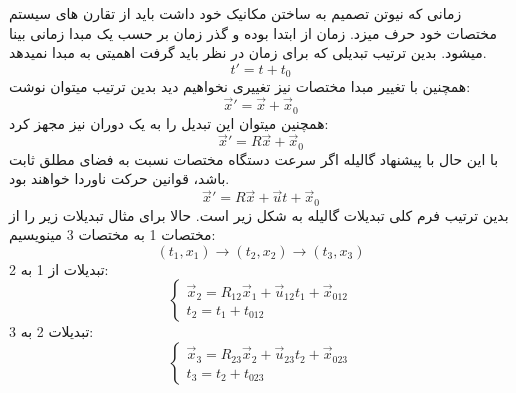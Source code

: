 \documentclass[9pt,a4paper, twocolumn]{article}
\begin{document}
            زمانی که نیوتن تصمیم به ساختن مکانیک خود داشت باید از تقارن های سیستم مختصات خود حرف میزد. زمان از ابتدا بوده و گذر زمان بر حسب یک مبدا زمانی بینا میشود. بدین ترتیب تبدیلی که برای زمان در نظر باید گرفت اهمیتی به مبدا نمیدهد.
            \begin{equation}
                t' = t+ t_0
            \end{equation}
            همچنین با تغییر مبدا مختصات نیز تغییری نخواهیم دید بدین ترتیب میتوان نوشت:
            \begin{equation}
                \vec x' = \vec x + \vec x_0
            \end{equation}
            همچنین میتوان این تبدیل را به یک دوران نیز مجهز کرد:
            \begin{equation}
                \vec x' = R \vec x + \vec x_0
            \end{equation}
            با این حال با پیشنهاد گالیله اگر سرعت دستگاه مختصات نسبت به فضای مطلق ثابت باشد، قوانین حرکت ناوردا خواهند بود.
            \begin{equation}
                \vec x' = R \vec x + \vec ut + \vec x_0
            \end{equation}
            بدین ترتیب فرم کلی تبدیلات گالیله به شکل زیر است. حالا برای مثال تبدیلات زیر را از مختصات 1 به مختصات 3 مینویسیم:
            \begin{equation}
                (t_1,x_1)\rightarrow (t_2,x_2) \rightarrow (t_3, x_3)
            \end{equation}
            تبدیلات از 1 به 2:
            \begin{equation}
                \left\{
                    \begin{matrix}
                        \vec x_2 = R_{12} \vec x_1 + \vec u_{12}t_1 + \vec x_{012}
                        \\
                        t_2 = t_1 + t_012
                    \end{matrix}
                \right.
            \end{equation}
            تبدیلات 2 به 3:
            \begin{equation}
                \left\{
                    \begin{matrix}
                        \vec x_3 = R_{23} \vec x_2 + \vec u_{23}t_2 + \vec x_{023}
                        \\
                        t_3 = t_2 + t_023
                    \end{matrix}
                \right.
            \end{equation}
\end{document}
